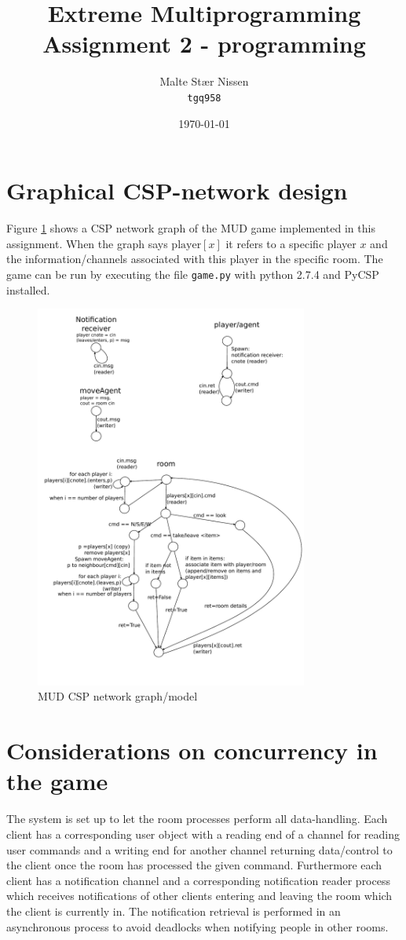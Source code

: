 \documentclass[11pt,a4paper]{article}
\title{Extreme Multiprogramming\\Assignment 2 - programming}
\author{Malte Stær Nissen\\\texttt{tgq958}}
\begin{document}
\date{\today}

\maketitle
\section{Graphical CSP-network design}
Figure \ref{fig:model} shows a CSP network graph of the MUD game implemented in
this assignment. When the graph says $\text{player}[x]$ it refers to a
specific player $x$ and the information/channels associated with this player in
the specific room. The game can be run by executing the file \texttt{game.py}
with python 2.7.4 and PyCSP installed.
\begin{figure}
    \centering
    \includegraphics[width=0.8\textwidth]{network.pdf}
    \caption{MUD CSP network graph/model}
    \label{fig:model}
\end{figure}
\section{Considerations on concurrency in the game}
The system is set up to let the room processes perform all data-handling.
Each client has a corresponding user object with a reading end of a channel
for reading user commands and a writing end for another channel returning
data/control to the client once the room has processed the given command.
Furthermore each client has a notification channel and a corresponding
notification reader process which receives notifications of other clients
entering and leaving the room which the client is currently in. The
notification retrieval is performed in an asynchronous process to avoid
deadlocks when notifying people in other rooms.
\end{document}
